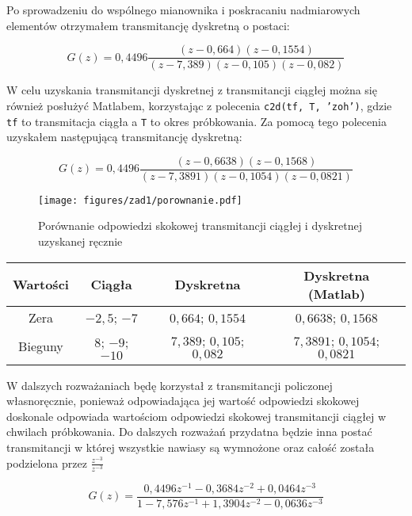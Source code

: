 \documentclass[a4paper,titlepage,11pt,floatssmall]{mwrep}
\begin{document}
Po sprowadzeniu do wspólnego mianownika i poskracaniu nadmiarowych elementów otrzymałem transmitancję dyskretną o postaci: 

\begin{equation*}
G(z) = 0,4496\frac{(z - 0,664)(z - 0,1554)}{(z - 7,389)(z - 0,105)(z - 0,082)} 
\end{equation*}

W celu uzyskania transmitancji dyskretnej z transmitancji ciągłej można się również posłużyć Matlabem, korzystając z polecenia \texttt{c2d(tf, T, 'zoh')}, gdzie \texttt{tf} to transmitacja ciągła a \texttt{T} to okres próbkowania. Za pomocą tego polecenia uzyskałem następującą transmitancję dyskretną:

\begin{equation*}
G(z) = 0,4496\frac{(z - 0,6638)(z - 0,1568)}{(z - 7,3891)(z - 0,1054)(z - 0,0821)} 
\end{equation*}



\begin{figure}[H]
\centering
\texttt{[image: figures/zad1/porownanie.pdf]}
\caption{Porównanie odpowiedzi skokowej transmitancji ciągłej i dyskretnej uzyskanej ręcznie}
\end{figure}

\begin{center}
\begin{tabular}{|c|c|c|c|} \hline
Wartości & Ciągła & Dyskretna & Dyskretna (Matlab) \\
\hline \hline
Zera & $-2,5$; $-7$ & $0,664$; $0,1554$  & $0,6638$; $0,1568$\\
\hline
Bieguny & $8$; $-9$; $-10$ & $7,389$; $0,105$; $0,082$ & $7,3891$; $0,1054$; $0,0821$ \\
\hline 
\end{tabular}
\end{center}

W dalszych rozważaniach będę korzystał z transmitancji policzonej własnoręcznie, ponieważ odpowiadająca jej wartość odpowiedzi skokowej doskonale odpowiada wartościom odpowiedzi skokowej transmitancji ciągłej w chwilach próbkowania. Do dalszych rozważań przydatna będzie inna postać transmitancji w której wszystkie nawiasy są wymnożone oraz całość została podzielona przez $\frac{z^{-3}}{z^{-3}}$

\begin{equation*}
G(z) = \frac{0,4496z^{-1} - 0,3684z^{-2} + 0,0464z^{-3}}{1 - 7,576z^{-1} + 1,3904z^{-2} - 0,0636z^{-3}}
\end{equation*}
\end{document}
